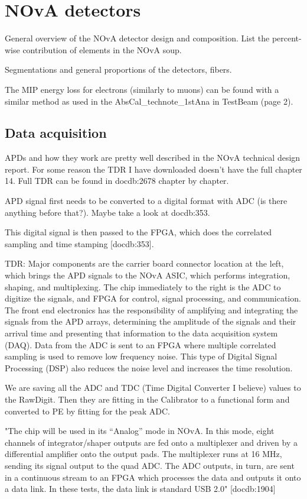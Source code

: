 \section{NOvA detectors}

General overview of the NOvA detector design and composition. List the percent-wise contribution of elements in the NOvA soup.

Segmentations and general proportions of the detectors, fibers.

The MIP energy loss for electrons (similarly to muons) can be found with a similar method as used in the AbsCal\_technote\_1stAna in TestBeam (page 2).

\subsection{Data acquisition}

APDs and how they work are pretty well described in the NOvA technical design report. For some reason the TDR I have downloaded doesn't have the full chapter 14. Full TDR can be found in docdb:2678 chapter by chapter.

APD signal first needs to be converted to a digital format with ADC (is there anything before that?). Maybe take a look at docdb:353.

This digital signal is then passed to the FPGA, which does the correlated sampling and time stamping [docdb:353].

TDR:
Major components are the carrier board connector location at the left, which brings the APD signals to the NOvA ASIC, which performs integration, shaping, and multiplexing. The chip immediately to the right is the ADC to digitize the signals, and FPGA for control, signal processing, and communication.
The front end electronics has the responsibility of amplifying and integrating the signals from the APD arrays, determining the amplitude of the signals and their arrival time and presenting that information to the data acquisition system (DAQ).
Data from the ADC is sent to an FPGA where multiple correlated sampling is used to remove low frequency noise. This type of Digital Signal Processing (DSP) also reduces the noise level and increases the time resolution.

We are saving all the ADC and TDC (Time Digital Converter I believe) values to the RawDigit. Then they are fitting in the Calibrator to a functional form and converted to PE by fitting for the peak ADC.

"The chip will be used in its “Analog” mode in NOvA. In this mode, eight channels of integrator/shaper outputs are fed onto a multiplexer and driven by a differential amplifier onto the output pads. The multiplexer runs at 16 MHz, sending its signal output to the quad ADC. The ADC outputs, in turn, are sent in a continuous stream to an FPGA which processes the data and outputs it onto a data link. In these tests, the data link is standard USB 2.0" [docdb:1904]

